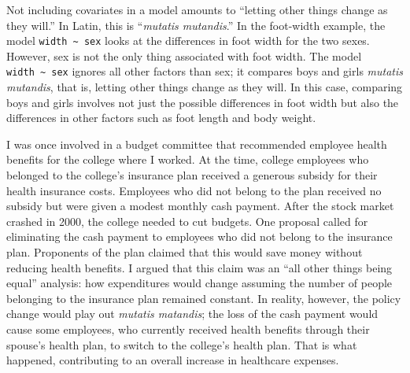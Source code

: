 \documentclass[
  letterpaper,
  DIV=11,
  numbers=noendperiod,
  oneside]{scrreprt}
\begin{document}
Not including covariates in a model amounts to ``letting other things
change as they will.'' In Latin, this is ``\emph{mutatis mutandis}.'' In
the foot-width example, the model \texttt{width\ \textasciitilde{}\ sex}
looks at the differences in foot width for the two sexes. However, sex
is not the only thing associated with foot width. The model
\texttt{width\ \textasciitilde{}\ sex} ignores all other factors than
sex; it compares boys and girls \emph{mutatis mutandis}, that is,
letting other things change as they will. In this case, comparing boys
and girls involves not just the possible differences in foot width but
also the differences in other factors such as foot length and body
weight.

\begin{tcolorbox}[enhanced jigsaw, colbacktitle=quarto-callout-note-color!10!white, breakable, opacitybacktitle=0.6, colback=white, left=2mm, arc=.35mm, colframe=quarto-callout-note-color-frame, coltitle=black, toprule=.15mm, opacityback=0, leftrule=.75mm, bottomtitle=1mm, toptitle=1mm, titlerule=0mm, title=\textcolor{quarto-callout-note-color}{\faInfo}\hspace{0.5em}{Example: One change can bring another}, rightrule=.15mm, bottomrule=.15mm]

I was once involved in a budget committee that recommended employee
health benefits for the college where I worked. At the time, college
employees who belonged to the college's insurance plan received a
generous subsidy for their health insurance costs. Employees who did not
belong to the plan received no subsidy but were given a modest monthly
cash payment. After the stock market crashed in 2000, the college needed
to cut budgets. One proposal called for eliminating the cash payment to
employees who did not belong to the insurance plan. Proponents of the
plan claimed that this would save money without reducing health
benefits. I argued that this claim was an ``all other things being
equal'' analysis: how expenditures would change assuming the number of
people belonging to the insurance plan remained constant. In reality,
however, the policy change would play out \emph{mutatis matandis}; the
loss of the cash payment would cause some employees, who currently
received health benefits through their spouse's health plan, to switch
to the college's health plan. That is what happened, contributing to an
overall increase in healthcare expenses.

\end{tcolorbox}
\end{document}
